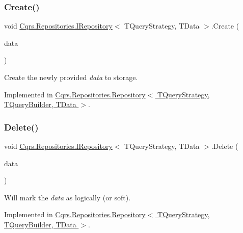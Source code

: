 \subsubsection{\texorpdfstring{Create()}{Create()}\hspace{0.1cm}{\footnotesize\ttfamily [2/2]}}
{\footnotesize\ttfamily void \hyperlink{interfaceCqrs_1_1Repositories_1_1IRepository}{Cqrs.\+Repositories.\+I\+Repository}$<$ T\+Query\+Strategy, T\+Data $>$.Create (\begin{DoxyParamCaption}\item[{I\+Enumerable$<$ T\+Data $>$}]{data }\end{DoxyParamCaption})}



Create the newly provided {\itshape data}  to storage. 



Implemented in \hyperlink{classCqrs_1_1Repositories_1_1Repository_a2af8103cc2946317f8ee9ede643bbc68_a2af8103cc2946317f8ee9ede643bbc68}{Cqrs.\+Repositories.\+Repository$<$ T\+Query\+Strategy, T\+Query\+Builder, T\+Data $>$}.

\mbox{\label{interfaceCqrs_1_1Repositories_1_1IRepository_a71c60de3588a757da2d25350c98374fd_a71c60de3588a757da2d25350c98374fd}} 
\subsubsection{\texorpdfstring{Delete()}{Delete()}}
{\footnotesize\ttfamily void \hyperlink{interfaceCqrs_1_1Repositories_1_1IRepository}{Cqrs.\+Repositories.\+I\+Repository}$<$ T\+Query\+Strategy, T\+Data $>$.Delete (\begin{DoxyParamCaption}\item[{T\+Data}]{data }\end{DoxyParamCaption})}



Will mark the {\itshape data}  as logically (or soft). 



Implemented in \hyperlink{classCqrs_1_1Repositories_1_1Repository_ac9d88baa6afcea85553fd233ba406e48_ac9d88baa6afcea85553fd233ba406e48}{Cqrs.\+Repositories.\+Repository$<$ T\+Query\+Strategy, T\+Query\+Builder, T\+Data $>$}.

